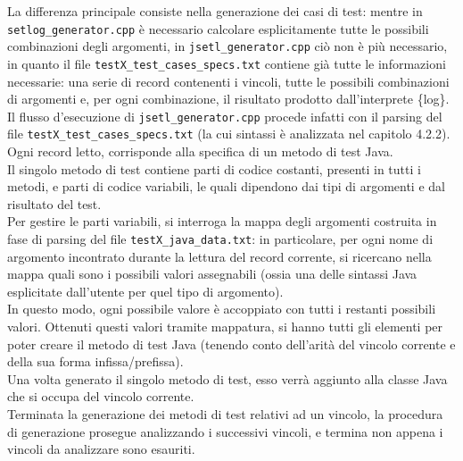 La differenza principale consiste nella generazione dei casi di test: mentre in \\ \texttt{setlog\_generator.cpp} è necessario calcolare esplicitamente tutte le possibili combinazioni degli argomenti, in \texttt{jsetl\_generator.cpp} ciò non è più necessario, in quanto il file \texttt{testX\_test\_cases\_specs.txt} contiene già tutte le informazioni necessarie: una serie di record contenenti i vincoli, tutte le possibili combinazioni di argomenti e, per ogni combinazione, il risultato prodotto dall'interprete \{log\}.\\
Il flusso d'esecuzione di \texttt{jsetl\_generator.cpp} procede infatti con il parsing del file \texttt{testX\_test\_cases\_specs.txt} (la cui sintassi è analizzata nel capitolo 4.2.2).\\
Ogni record letto, corrisponde alla specifica di un metodo di test Java.\\
Il singolo metodo di test contiene parti di codice costanti, presenti in tutti i metodi, e parti di codice variabili, le quali dipendono dai tipi di argomenti e dal risultato del test.\\

Per gestire le parti variabili, si interroga la mappa degli argomenti costruita in fase di parsing del file \texttt{testX\_java\_data.txt}: in particolare, per ogni nome di argomento incontrato durante la lettura del record corrente, si ricercano nella mappa quali sono i possibili valori assegnabili (ossia una delle sintassi Java esplicitate dall'utente per quel tipo di argomento). \\
In questo modo, ogni possibile valore è accoppiato con tutti i restanti possibili valori. Ottenuti questi valori tramite mappatura, si hanno tutti gli elementi per poter creare il metodo di test Java (tenendo conto dell'arità del vincolo corrente e della sua forma infissa/prefissa).\\

Una volta generato il singolo metodo di test, esso verrà aggiunto alla classe Java che si occupa del vincolo corrente.\\
Terminata la generazione dei metodi di test relativi ad un vincolo, la procedura di generazione prosegue analizzando i successivi vincoli, e termina non appena i vincoli da analizzare sono esauriti.\\

\newpage
\thispagestyle{empty}
\mbox{}


